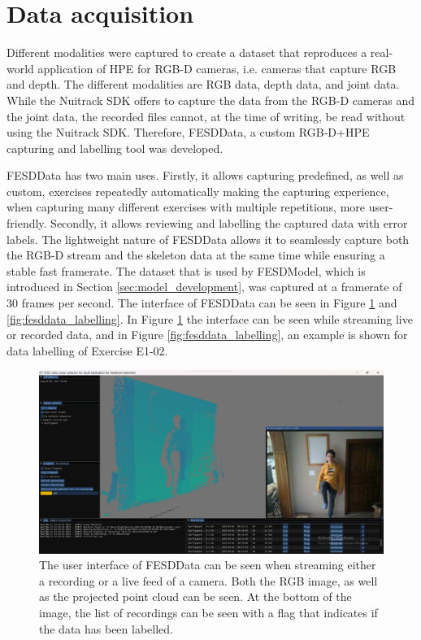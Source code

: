 \section{Data acquisition}
\label{sec:data_acquisition}

Different modalities were captured to create a dataset that reproduces a real-world application of HPE for RGB-D cameras, i.e. cameras that capture RGB and depth. The different modalities are RGB data, depth data, and joint data. While the Nuitrack SDK offers to capture the data from the RGB-D cameras and the joint data, the recorded files cannot, at the time of writing, be read without using the Nuitrack SDK. Therefore, FESDData, a custom RGB-D+HPE capturing and labelling tool was developed. 

FESDData has two main uses. Firstly, it allows capturing predefined, as well as custom, exercises repeatedly automatically making the capturing experience, when capturing many different exercises with multiple repetitions, more user-friendly. Secondly, it allows reviewing and labelling the captured data with error labels. The lightweight nature of FESDData allows it to seamlessly capture both the RGB-D stream and the skeleton data at the same time while ensuring a stable fast framerate. The dataset that is used by FESDModel, which is introduced in Section \ref{sec:model_development}, was captured at a framerate of 30 frames per second. The interface of FESDData can be seen in Figure \ref{fig:fesddata_recording} and \ref{fig:fesddata_labelling}. In Figure \ref{fig:fesddata_recording} the interface can be seen while streaming live or recorded data, and in Figure \ref{fig:fesddata_labelling}, an example is shown for data labelling of Exercise E1-02.

\begin{figure}
  \centering
  \includegraphics[width=.8\textwidth]{figures/FESDData/streaming.png}
  \caption[FESDData user interface for data streaming and recording]{The user interface of FESDData can be seen when streaming either a recording or a live feed of a camera. Both the RGB image, as well as the projected point cloud can be seen. At the bottom of the image, the list of recordings can be seen with a flag that indicates if the data has been labelled.}
  \label{fig:fesddata_recording}
\end{figure}


